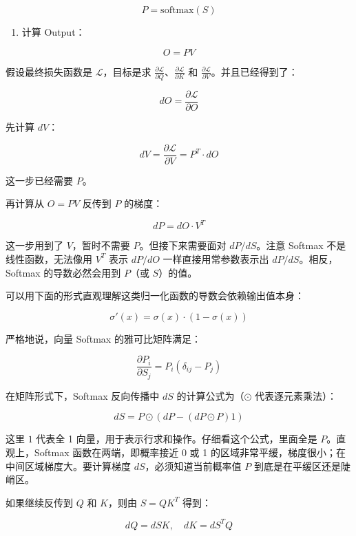 \[
P = \mathrm{softmax}(S)
\]

\begin{enumerate}
\def\labelenumi{\arabic{enumi}.}
\setcounter{enumi}{2}
\tightlist
\item
{}
  计算 Output：
\end{enumerate}

\[
O = PV
\]

假设最终损失函数是 \(\mathcal{L}\)，目标是求 \(\frac{\partial \mathcal{L}}{\partial Q}\)、\(\frac{\partial \mathcal{L}}{\partial K}\) 和 \(\frac{\partial \mathcal{L}}{\partial V}\)。并且已经得到了：

\[
dO = \frac{\partial \mathcal{L}}{\partial O}
\]

先计算 \(dV\)：

\[
dV = \frac{\partial \mathcal{L}}{\partial V} = P^T \cdot dO
\]

这一步已经需要 \(P\)。

再计算从 \(O = PV\) 反传到 \(P\) 的梯度：

\[
dP = dO \cdot V^T
\]

这一步用到了 \(V\)，暂时不需要 \(P\)。但接下来需要面对 \(dP/dS\)。注意 Softmax 不是线性函数，无法像用 \(V^T\) 表示 \(dP/dO\) 一样直接用常参数表示出 \(dP/dS\)。相反，Softmax 的导数必然会用到 \(P\)（或 \(S\)）的值。

可以用下面的形式直观理解这类归一化函数的导数会依赖输出值本身：

\[
\sigma'(x) = \sigma(x)\cdot(1-\sigma(x))
\]

严格地说，向量 Softmax 的雅可比矩阵满足：

\[
\frac{\partial P_i}{\partial S_j} = P_i(\delta_{ij}-P_j)
\]

在矩阵形式下，Softmax 反向传播中 \(dS\) 的计算公式为（\(\odot\) 代表逐元素乘法）：

\[
dS = P \odot \left(dP - (dP \odot P)1\right)
\]

这里 \(1\) 代表全 1 向量，用于表示行求和操作。仔细看这个公式，里面全是 \(P\)。直观上，Softmax 函数在两端，即概率接近 0 或 1 的区域非常平缓，梯度很小；在中间区域梯度大。要计算梯度 \(dS\)，必须知道当前概率值 \(P\) 到底是在平缓区还是陡峭区。

如果继续反传到 \(Q\) 和 \(K\)，则由 \(S = QK^T\) 得到：

\[
dQ = dS K,\quad dK = dS^T Q
\]

